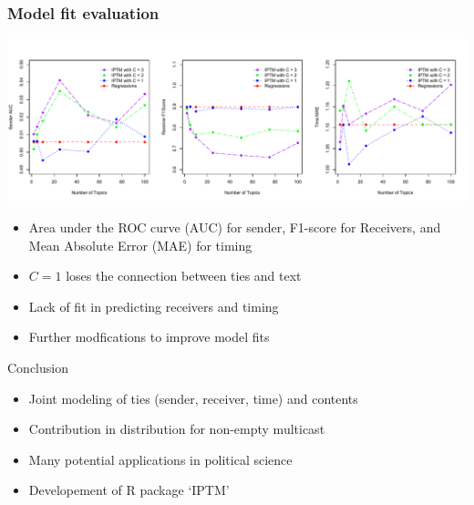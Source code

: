 \documentclass[10pt, xcolor=table]{beamer}
\def\bni{\begin{itemize}} \def\ei{\end{itemize}}
\theoremstyle{definition}
\theoremstyle{remark}
\begin{document}
\begin{frame} \frametitle{Model fit evaluation}
\begin{center}
	\includegraphics[width=1\textwidth]{figures/Dare_PPE_22.pdf}
	\end{center}
\begin{itemize}
	\item Area under the ROC curve (AUC) for sender, F1-score for Receivers, and Mean Absolute Error (MAE) for timing
	\item $C=1$ loses the connection between ties and text
	\item Lack of fit in predicting receivers and timing
	\item Further modfications to improve model fits
\end{itemize}
\end{frame}


\begin{frame}{Conclusion}
 \bni
 \item Joint modeling of ties (sender, receiver, time) and contents
 	\vspace{0.4cm}
 \item Contribution in distribution for non-empty multicast
 	\vspace{0.4cm}
 \item Many potential applications in political science
 	\vspace{0.4cm}
 	\item Developement of R package `IPTM'
 \ei
\end{frame}
\end{document}
